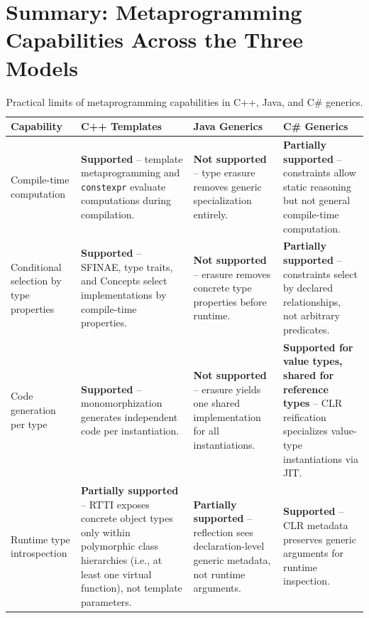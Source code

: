 \documentclass[11pt]{report}
\begin{document}
\section{Summary: Metaprogramming Capabilities Across the Three Models}
\begin{table}[h]
\centering
\begin{tabular}{|p{2.8cm}|p{3.8cm}|p{3.8cm}|p{3.8cm}|}
\hline
\textbf{Capability} & \textbf{C++ Templates} & \textbf{Java Generics} & \textbf{C\# Generics} \\
\hline
Compile-time computation &
\textbf{Supported} -- template metaprogramming and \texttt{constexpr}
evaluate computations during compilation. &
\textbf{Not supported} -- type erasure removes generic specialization
entirely. &
\textbf{Partially supported} -- constraints allow static reasoning but not
general compile-time computation. \\
\hline
Conditional selection by type properties &
\textbf{Supported} -- SFINAE, type traits, and Concepts select
implementations by compile-time properties. &
\textbf{Not supported} -- erasure removes concrete type properties before
runtime. &
\textbf{Partially supported} -- constraints select by declared
relationships, not arbitrary predicates. \\
\hline
Code generation per type &
\textbf{Supported} -- monomorphization generates independent code per
instantiation. &
\textbf{Not supported} -- erasure yields one shared implementation for all
instantiations. &
\textbf{Supported for value types, shared for reference types} -- CLR
reification specializes value-type instantiations via JIT. \\
\hline
Runtime type introspection &
\textbf{Partially supported} -- RTTI exposes concrete object types only
within polymorphic class hierarchies (i.e., at least one virtual function),
not template parameters. &
\textbf{Partially supported} -- reflection sees declaration-level generic
metadata, not runtime arguments. &
\textbf{Supported} -- CLR metadata preserves generic arguments for runtime
inspection. \\
\hline
\end{tabular}
\caption{Practical limits of metaprogramming capabilities in C++, Java, and
C\# generics.}
\label{tab:metaprogramming_limits}
\end{table}
\end{document}
